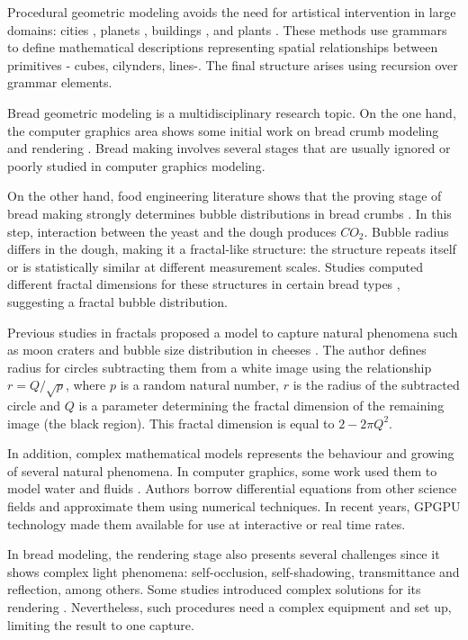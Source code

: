 \documentclass[final,5p,times]{elsarticle}
\begin{document}
Procedural geometric modeling avoids the need for artistical intervention in large domains: cities \cite{Parish2001}, planets \cite{Ebert2002}, buildings \cite{Muller2006}, and plants \cite{Prusinkiewicz1990}. These methods use grammars to define mathematical descriptions representing spatial relationships between primitives - cubes, cilynders, lines-. The final structure arises using recursion over grammar elements.

Bread geometric modeling is a multidisciplinary research topic. On the one hand, the computer graphics area shows some initial work on bread crumb modeling and rendering \cite{Tong2005,Cho2007}.  Bread making involves several stages that are usually ignored or poorly studied in computer graphics modeling.

On the other hand, food engineering literature shows that the proving stage of bread making strongly determines bubble distributions in bread crumbs \cite{Babin2006}. In this step, interaction between the yeast and the dough produces {\em $CO_{2}$}. Bubble radius differs in the dough, making it a fractal-like structure: the structure repeats itself or is statistically similar at different measurement scales. Studies computed different fractal dimensions for these structures in certain bread types \cite{Gonzales2008}, suggesting a fractal bubble distribution.

Previous studies in fractals proposed a model to capture natural phenomena such as moon craters and bubble size distribution in cheeses \cite{Mandelbrot1982}. The author defines radius for circles subtracting them from a white image using the relationship $r = Q/\sqrt{p}$, where $p$ is a random natural number, $r$ is the radius of the subtracted circle and $Q$ is a parameter determining the fractal dimension of the remaining image (the black region). This fractal dimension is equal to $2-2\pi Q^{2}$.

In addition, complex mathematical models represents the behaviour and growing of several natural phenomena. In computer graphics, some work used them to model water and fluids \cite{Stam1999,Fedkiw2001}. Authors borrow differential equations from other science fields and approximate them using numerical techniques. In recent years, GPGPU technology \cite{Owens2007} made them available for use at interactive or real time rates.

In bread modeling, the rendering stage also presents several challenges since it shows complex light phenomena: self-occlusion, self-shadowing, transmittance and reflection, among others. Some studies introduced complex solutions for its rendering \cite{Tong2005}. Nevertheless, such procedures need a complex equipment and set up, limiting the result to one capture. 
\end{document}
